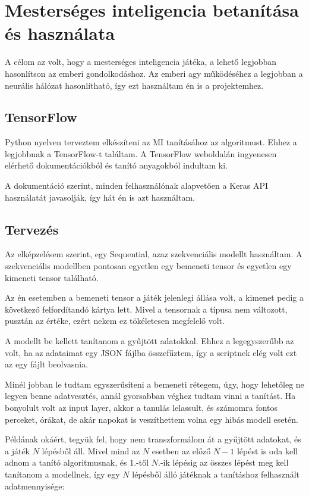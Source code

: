 \chapter{Mesterséges inteligencia betanítása és használata}
\thispagestyle{fancy}
\pagestyle{fancy}


A célom az volt, hogy a mesterséges inteligencia játéka, a lehető legjobban hasonlítson az emberi gondolkodáshoz. Az emberi agy működéséhez a legjobban 
a neurális hálózat hasonlítható, így ezt használtam én is a projektemhez. 



\section{TensorFlow}
Python nyelven terveztem elkészíteni az MI tanításához az algoritmust. Ehhez a legjobbnak a TensorFlow-t \cite{tensorflow2015-whitepaper} találtam.
A TensorFlow weboldalán ingyenesen elérhető dokumentációkból és tanító anyagokból indultam ki. 

A dokumentáció szerint, minden felhasználónak alapvetően a Keras API \cite{chollet2015keras} használatát javasolják, így hát én is azt használtam. 

\section{Tervezés}
Az elképzelésem szerint, egy Sequential, azaz szekvenciális modellt használtam. A szekvenciális modellben pontosan egyetlen egy bemeneti tensor és egyetlen egy kimeneti tensor található.

Az én esetemben a bemeneti tensor a játék jelenlegi állása volt, a kimenet pedig a következő felfordítandó kártya lett. Mivel a tensornak a típusa nem változott, pusztán az értéke, ezért nekem ez tökéletesen megfelelő volt.

A modellt be kellett tanítanom a gyűjtött adatokkal. Ehhez a legegyszerűbb az volt, ha az adataimat egy JSON fájlba összefűztem, így a scriptnek elég volt ezt az egy fájlt beolvasnia.

Minél jobban le tudtam egyszerűsíteni a bemeneti rétegem, úgy, hogy lehetőleg ne legyen benne adatvesztés, annál gyorsabban véghez tudtam vinni a tanítást. 
Ha bonyolult volt az input layer, akkor a tanulás lelassult, és számomra fontos perceket, órákat, de akár napokat is veszíthettem volna egy hibás modell esetén.

Példának okáért, tegyük fel, hogy nem transzformálom át a gyűjtött adatokat, és a játék $N$ lépésből áll. 
Mivel mind az $N$ esetben az előző $N-1$ lépést is oda kell adnom a tanító algoritmusnak, és 1.-től $N.$-ik lépésig az összes lépést meg kell tanítanom a modellnek, 
így egy $N$ lépésből álló játéknak a tanításhoz felhasznált adatmennyisége:

